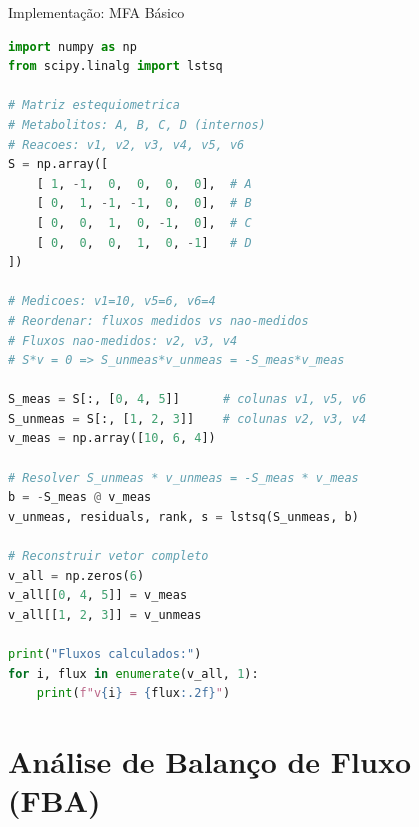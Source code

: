 \begin{frame}[fragile]{Implementação: MFA Básico}
\begin{lstlisting}[language=Python, caption=Resolução de fluxos por balanço de massa]
import numpy as np
from scipy.linalg import lstsq

# Matriz estequiometrica
# Metabolitos: A, B, C, D (internos)
# Reacoes: v1, v2, v3, v4, v5, v6
S = np.array([
    [ 1, -1,  0,  0,  0,  0],  # A
    [ 0,  1, -1, -1,  0,  0],  # B
    [ 0,  0,  1,  0, -1,  0],  # C
    [ 0,  0,  0,  1,  0, -1]   # D
])

# Medicoes: v1=10, v5=6, v6=4
# Reordenar: fluxos medidos vs nao-medidos
# Fluxos nao-medidos: v2, v3, v4
# S*v = 0 => S_unmeas*v_unmeas = -S_meas*v_meas

S_meas = S[:, [0, 4, 5]]      # colunas v1, v5, v6
S_unmeas = S[:, [1, 2, 3]]    # colunas v2, v3, v4
v_meas = np.array([10, 6, 4])

# Resolver S_unmeas * v_unmeas = -S_meas * v_meas
b = -S_meas @ v_meas
v_unmeas, residuals, rank, s = lstsq(S_unmeas, b)

# Reconstruir vetor completo
v_all = np.zeros(6)
v_all[[0, 4, 5]] = v_meas
v_all[[1, 2, 3]] = v_unmeas

print("Fluxos calculados:")
for i, flux in enumerate(v_all, 1):
    print(f"v{i} = {flux:.2f}")
\end{lstlisting}
\end{frame}

\section{Análise de Balanço de Fluxo (FBA)}

